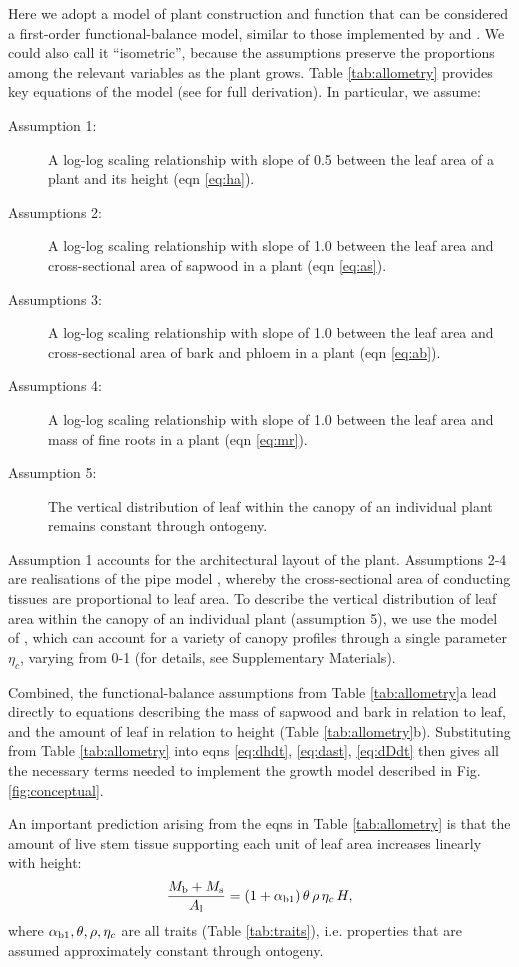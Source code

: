 \documentclass[a4paper,11pt]{article}
\begin{document}
Here we adopt a model of plant construction and function that can be considered a first-order functional-balance model, similar to those implemented by \citet{Makela-1997} and \citet{Moorcroft-2001}. We could also call it ``isometric'', because the assumptions preserve the proportions among the relevant variables as the plant grows. Table \ref{tab:allometry} provides key equations of the model (see \citet{Falster-2016} for full derivation). In particular, we assume:
\begin{description}
\item[Assumption 1:] A log-log scaling relationship with slope of 0.5 between the leaf area of a plant and its height (eqn \ref{eq:ha}).
\item[Assumptions 2:] A log-log scaling relationship with slope of 1.0 between the leaf area and cross-sectional area of sapwood in a plant (eqn \ref{eq:as}).
\item[Assumptions 3:] A log-log scaling relationship with slope of 1.0 between the leaf area and cross-sectional area of bark and phloem in a plant (eqn \ref{eq:ab}).
\item[Assumptions 4:] A log-log scaling relationship with slope of 1.0 between the leaf area and mass of fine roots in a plant (eqn \ref{eq:mr}).
\item[Assumption 5:] The vertical distribution of leaf within the canopy of an individual plant remains constant through ontogeny.
\end{description}
Assumption 1 accounts for the architectural layout of the plant. Assumptions 2-4 are realisations of the pipe model \citep{Shinozaki-1964}, whereby the cross-sectional area of conducting tissues are proportional to leaf area. To describe the vertical distribution of leaf area within the canopy of an individual plant (assumption 5), we use the model of \citet{Yokozawa-1995}, which can account for a variety of canopy profiles through a single parameter $\eta_c$, varying from 0-1 (for details, see Supplementary Materials).

Combined, the functional-balance assumptions from Table \ref{tab:allometry}a lead directly to equations describing the mass of sapwood and bark in relation to leaf, and the amount of leaf in relation to height (Table \ref{tab:allometry}b). Substituting from Table \ref{tab:allometry} into eqns \ref{eq:dhdt}, \ref{eq:dast}, \ref{eq:dDdt} then gives all the necessary terms needed to implement the growth model described in Fig. \ref{fig:conceptual}.

An important prediction arising from the eqns in Table \ref{tab:allometry} is that the amount of live stem tissue supporting each unit of leaf area increases linearly with  height:
\begin{equation}\label{eq:msml}
\frac{M_{\rm b} + M_{\rm s}}{A_{\rm l}} = (1+ \alpha_{\rm b1}) \,\theta \, \rho \, \eta_c \, H,
\end{equation}
where $\alpha_{\rm b1}, \theta, \rho, \eta_c$ are all traits (Table \ref{tab:traits}), i.e. properties that are assumed approximately constant through ontogeny.
\end{document}
